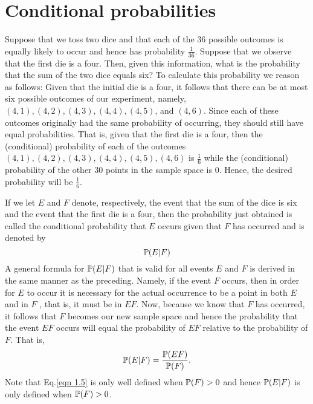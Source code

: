 \section{Conditional probabilities}

Suppose that we toss two dice and that each of the $36$ possible outcomes is equally likely to occur and hence has probability $\frac{1}{36}$. Suppose that we observe that the first die is a four. Then, given this information, what is the probability that the sum of the two dice equals six? To calculate this probability we reason as follows: Given that
the initial die is a four, it follows that there can be at most six possible outcomes of our experiment, namely, $(4, 1), (4, 2), (4, 3), (4, 4), (4, 5)$, and $(4, 6)$. Since each of these outcomes originally had the same probability of occurring, they should still have equal probabilities. That is, given that the first die is a four, then the (conditional) probability of each of the outcomes $(4, 1), (4, 2), (4, 3), (4, 4), (4, 5), (4, 6)$ is $\frac{1}{6}$ while the (conditional) probability of the other $30$ points in the sample space is $0$. Hence, the desired probability will be $\frac{1}{6}$.

If we let $E$ and $F$ denote, respectively, the event that the sum of the dice is six and the event that the first die is a four, then the probability just obtained is called the conditional probability that $E$ occurs given that $F$ has occurred and is denoted by
\begin{equation*}
    \mathbb{P} (E | F)
\end{equation*}
A general formula for $\mathbb{P} (E|F)$ that is valid for all events $E$ and $F$ is derived in the same manner as the preceding. Namely, if the event $F$ occurs, then in order for $E$ to occur it is necessary for the actual occurrence to be a point in both $E$ and in $F$ , that is, it must be in $EF$. Now, because we know that $F$ has occurred, it follows that $F$ becomes our new sample space and hence the probability that the event $EF$ occurs will equal the probability of $EF$ relative to the probability of $F$. That is,
\begin{equation} \label{eqn 1.5}
    \mathbb{P} (E | F) = \frac{\mathbb{P} (EF)}{\mathbb{P} (F)}.
\end{equation}
Note that Eq.\eqref{eqn 1.5} is only well defined when $\mathbb{P} (F) > 0$ and hence $\mathbb{P} (E|F)$ is only defined when $\mathbb{P} (F) > 0$.


